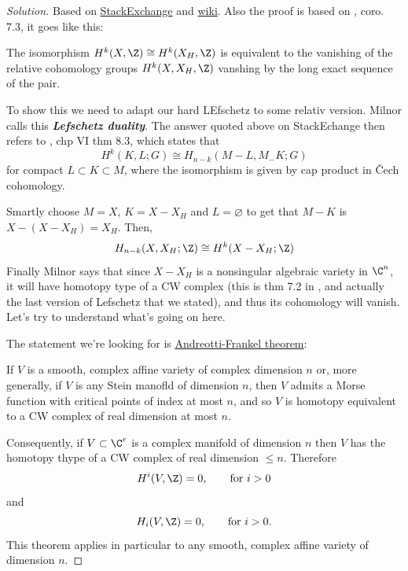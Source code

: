 \begin{proof}[Solution]
	Based on \href{https://math.stackexchange.com/questions/712791/application-of-lefschetz-duality-to-prove-lefschetz-hyperplane-theorem}{StackExchange} and \href{https://en.wikipedia.org/wiki/Lefschetz_hyperplane_theorem}{wiki}. Also the proof is based on \cite{milnor}, coro. 7.3, it goes like this:

	The isomorphism $H^{k}(X,\Z)\cong H^{k}(X_H,\Z)$ is equivalent to the vanishing of the relative cohomology groups $ H^{k}(X,X_H,\Z)$ vanshing by the long exact sequence of the pair.

	To show this we need to adapt our hard LEfschetz to some relativ version. Milnor calls this \textit{\textbf{Lefschetz duality}}. The answer quoted above on StackEchange then refers to \cite{bredon}, chp VI thm 8.3, which states that
\begin{equation*}
	H^{k}(K,L;G)\cong H_{n-k}(M-L,M_-K;G)
\end{equation*}
for compact $L\subset K\subset M$, where the isomorphism is given by cap product in \v Cech cohomology.

Smartly choose $M=X$, $K=X-X_H$ and $L=\varnothing$ to get that $M-K$ is $X-(X-X_H)=X_H$. Then,
\begin{equation*}
	H_{n-k}(X,X_H;\Z)\cong H^{k}(X-X_H;\Z)
\end{equation*}
Finally Milnor says that since $X-X_H$ is a nonsingular algebraic variety in $\C^n$, it will have homotopy type of a CW complex (this is thm 7.2 in \cite{milnor}, and actually the last version of Lefschetz that we stated), and thus its cohomology will vanish. Let's try to understand what's going on here.

The statement we're looking for is \href{https://en.wikipedia.org/wiki/Andreotti–Frankel_theorem}{Andreotti-Frankel theorem}:

\begin{thm}
	If $V$ is a smooth, complex affine variety of complex dimension $n$ or, more generally, if $V$ is any Stein manofld of dimension $n$, then $V$ admits a Morse function with critical points of index at most $n$, and so $V$ is homotopy equivalent to a CW complex of real dimension at most $n$. 
\end{thm}

Consequently, if $V\subset \C^{r}$ is a complex manifold of dimension $n$ then $V$ has the homotopy thype of a CW complex of real dimension $\le n$. Therefore
\begin{equation*}
	H^{i}(V,\Z)=0,\qquad \text{for }i>0
\end{equation*}
and
\begin{equation*}
	H_{i}(V,\Z)=0,\qquad\text{for }i>0.
\end{equation*}
This theorem applies in particular to any smooth, complex affine variety of dimension $n$.


\end{proof}
